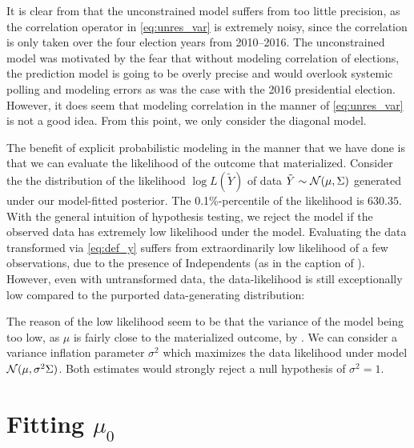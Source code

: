 \documentclass[12pt]{article}
\begin{document}
It is clear from  that the unconstrained model suffers from too little precision, as the correlation operator in \eqref{eq:unres_var} is extremely noisy, since the correlation is only taken over the four election years from 2010--2016. The unconstrained model was motivated by the fear that without modeling correlation of elections, the prediction model is going to be overly precise and would overlook systemic polling and modeling errors as was the case with the 2016 presidential election. However, it does seem that modeling correlation in the manner of \eqref{eq:unres_var} is not a good idea. From this point, we only consider the diagonal model. 


The benefit of explicit probabilistic modeling in the manner that we have done
is that we can evaluate the likelihood of the outcome that materialized. 
Consider the the distribution of the likelihood $\log L(\tilde Y)$ of data $\tilde Y \sim \mathcal{N}(\mu, \Sigma)$ generated under our model-fitted posterior. The 0.1\%-percentile of the likelihood is $630.35$. With the general intuition of hypothesis testing, we reject the model if the observed data has extremely low likelihood under the model. Evaluating the data transformed via \eqref{eq:def_y} suffers from extraordinarily low likelihood of a few observations, due to the presence of Independents (as in the caption of ). However, even with untransformed data, the data-likelihood is still exceptionally low compared to the purported data-generating distribution:
 

The reason of the low likelihood seem to be that the variance of the model being too low, as $\mu$ is fairly close to the materialized outcome, by . We can consider a variance inflation parameter $\sigma^2$ which maximizes the data likelihood under model $\mathcal{N}(\mu, \sigma^2 \Sigma)$.  Both estimates would strongly reject a null hypothesis of $\sigma^2 =1$.

\section{Fitting $\mu_0$}
\label{sec:mu}
\end{document}
